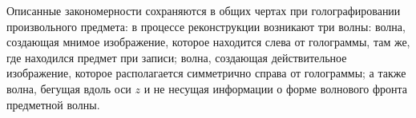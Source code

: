 Описанные закономерности сохраняются в общих чертах при голографировании произвольного предмета: в процессе реконструкции возникают три волны: волна, создающая мнимое изображение, которое
находится слева от голограммы, там же, где находился предмет при записи; волна, создающая действительное изображение, которое располагается симметрично справа от голограммы; а также волна, бегущая
вдоль оси $z$ и не несущая информации о форме волнового фронта предметной волны.
